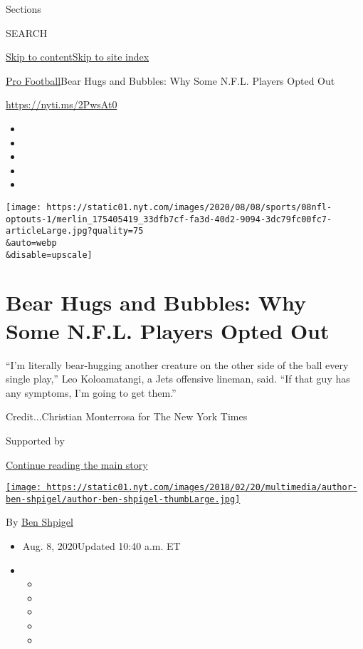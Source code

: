 Sections

SEARCH

\protect\hyperlink{site-content}{Skip to
content}\protect\hyperlink{site-index}{Skip to site index}

\href{/section/sports/football}{Pro Football}\textbar{}Bear Hugs and
Bubbles: Why Some N.F.L. Players Opted Out

\href{https://nyti.ms/2PwsAt0}{https://nyti.ms/2PwsAt0}

\begin{itemize}
\item
\item
\item
\item
\item
\end{itemize}

\texttt{[image: https://static01.nyt.com/images/2020/08/08/sports/08nfl-optouts-1/merlin\_175405419\_33dfb7cf-fa3d-40d2-9094-3dc79fc00fc7-articleLarge.jpg?quality=75\\\&auto=webp\\\&disable=upscale]}

\hypertarget{bear-hugs-and-bubbles-why-some-nfl-players-opted-out}{%
\section{Bear Hugs and Bubbles: Why Some N.F.L. Players Opted
Out}\label{bear-hugs-and-bubbles-why-some-nfl-players-opted-out}}

``I'm literally bear-hugging another creature on the other side of the
ball every single play,'' Leo Koloamatangi, a Jets offensive lineman,
said. ``If that guy has any symptoms, I'm going to get them.''

Credit...Christian Monterrosa for The New York Times

Supported by

\protect\hyperlink{after-sponsor}{Continue reading the main story}

\href{https://www.nytimes.com/by/ben-shpigel}{\texttt{[image: https://static01.nyt.com/images/2018/02/20/multimedia/author-ben-shpigel/author-ben-shpigel-thumbLarge.jpg]}}

By \href{https://www.nytimes.com/by/ben-shpigel}{Ben Shpigel}

\begin{itemize}
\item
  Aug. 8, 2020Updated 10:40 a.m. ET
\item
  \begin{itemize}
  \item
  \item
  \item
  \item
  \item
  \end{itemize}
\end{itemize}

